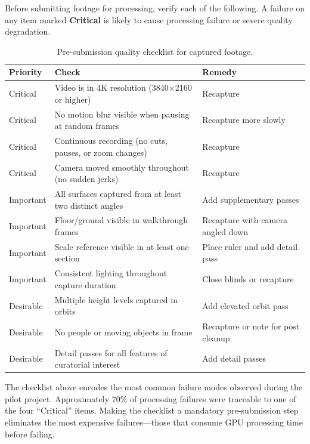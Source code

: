 Before submitting footage for processing, verify each of the following. A failure on any item marked \textbf{Critical} is likely to cause processing failure or severe quality degradation.

\begin{table}[htbp]
  \centering
  \caption{Pre-submission quality checklist for captured footage.}
  \label{tab:capture-checklist}
  \begin{tabular}{@{}l L{8cm} l@{}}
    \toprule
    \textbf{Priority} & \textbf{Check} & \textbf{Remedy} \\
    \midrule
    Critical & Video is in 4K resolution (3840$\times$2160 or higher) & Recapture \\
    Critical & No motion blur visible when pausing at random frames & Recapture more slowly \\
    Critical & Continuous recording (no cuts, pauses, or zoom changes) & Recapture \\
    Critical & Camera moved smoothly throughout (no sudden jerks) & Recapture \\
    \addlinespace
    Important & All surfaces captured from at least two distinct angles & Add supplementary passes \\
    Important & Floor/ground visible in walkthrough frames & Recapture with camera angled down \\
    Important & Scale reference visible in at least one section & Place ruler and add detail pass \\
    Important & Consistent lighting throughout capture duration & Close blinds or recapture \\
    \addlinespace
    Desirable & Multiple height levels captured in orbits & Add elevated orbit pass \\
    Desirable & No people or moving objects in frame & Recapture or note for post cleanup \\
    Desirable & Detail passes for all features of curatorial interest & Add detail passes \\
    \bottomrule
  \end{tabular}
\end{table}

\begin{keyfinding}
The checklist above encodes the most common failure modes observed during the pilot project. Approximately 70\% of processing failures were traceable to one of the four ``Critical'' items. Making the checklist a mandatory pre-submission step eliminates the most expensive failures---those that consume GPU processing time before failing.
\end{keyfinding}
